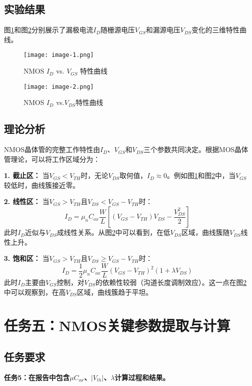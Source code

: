 \documentclass[UTF8,12pt,a4paper]{ctexart}
\begin{document}
\subsection{实验结果}
图\ref{fig:task4a}和图\ref{fig:task4b}分别展示了漏极电流$I_D$随栅源电压$V_{GS}$和漏源电压$V_{DS}$变化的三维特性曲线。

\begin{figure}[h]
\centering
\texttt{[image: image-1.png]}
\caption{NMOS $I_D$ vs. $V_{GS}$ 特性曲线}
\label{fig:task4a}
\end{figure}

\begin{figure}[h]
\centering
\texttt{[image: image-2.png]}
\caption{NMOS $I_D$ vs.$V_{DS}$特性曲线}
\label{fig:task4b}
\end{figure}

\subsection{理论分析}
NMOS晶体管的完整工作特性由$I_D$、$V_{GS}$和$V_{DS}$三个参数共同决定。根据MOS晶体管理论，可以将工作区域分为：

\textbf{1. 截止区：}
当$V_{GS} < V_{TH}$时，无论$V_{DS}$取何值，$I_D \approx 0$。例如图\ref{fig:task4a}和图\ref{fig:task4b}中，当$V_{GS}$较低时，曲线簇接近零。

\textbf{2. 线性区：}
当$V_{GS} > V_{TH}$且$V_{DS} < V_{GS}-V_{TH}$时：
\begin{equation}
I_D = \mu_n C_{ox}\frac{W}{L}\left[(V_{GS}-V_{TH})V_{DS} - \frac{V_{DS}^2}{2}\right]
\end{equation}
此时$I_D$近似与$V_{DS}$成线性关系。从图\ref{fig:task4b}中可以看到，在低$V_{DS}$区域，曲线簇随$V_{DS}$线性上升。

\textbf{3. 饱和区：}
当$V_{GS} > V_{TH}$且$V_{DS} \geq V_{GS}-V_{TH}$时：
\begin{equation}
I_D = \frac{1}{2}\mu_n C_{ox}\frac{W}{L}(V_{GS}-V_{TH})^2(1+\lambda V_{DS})
\end{equation}
此时$I_D$主要由$V_{GS}$控制，对$V_{DS}$的依赖性较弱（沟道长度调制效应）。这一点在图\ref{fig:task4b}中可以观察到，在高$V_{DS}$区域，曲线簇趋于平坦。



\newpage
\section{任务五：NMOS关键参数提取与计算}

\subsection{任务要求}
\textbf{任务5：在报告中包含$\mu C_{ox}$、$|V_{th}|$、$\lambda$计算过程和结果。}
\end{document}
